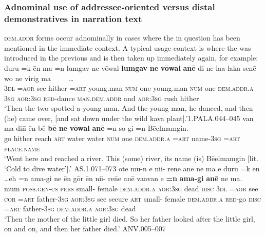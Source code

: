 \documentclass[output=paper
,modfonts
,nonflat]{langsci/langscibook}
\begin{document}
\subsubsection{Adnominal use of addressee-oriented versus distal demonstratives in narration text}
\textsc{dem.addr} forms occur adnominally in cases where the  in question has been mentioned in the immediate context. A typical usage context is where the  was introduced in the previous  and is then taken up immediately again, for example:
\ea	\label{ex46}
\gll		duru	=k 	{\textquotesingle}\=en 	ma	=n 	lumgav 		ne 	v\=owal			\textbf{lumgav} 		\textbf{ne}		\textbf{v\=owal} \textbf{an\=e}			di		ne 		laa-laka 	sen\=e 	wo 			ne 		virig 	ma~~~~~{\ob}\dots{\cb}		\\
		\textsc{3dl}	\textsc{=aor}	see		hither	\textsc{=art}	young.man	\textsc{num}		one		young.man 	\textsc{num}	one		\textsc{dem.addr.a}	\textsc{3sg}	\textsc{aor:3sg}	\textsc{red-}dance		\textsc{man.dem.addr}			and			\textsc{aor:3sg}	rush	hither \\
\glt	`Then the two spotted a young man. And the young man, he danced, and then (he) came over, [and sat down under the wild kava plant].'\hfill{1.PALA.044--045}
\z
\ea	\label{ex47}
\gll		van 	ma 		di\=n 		\=en 	b\=e		\textbf{b\=e} 		\textbf{ne} 	\textbf{v\=owal} \textbf{an\=e}		=n 		so-gi	=n		B\=e{\textquotesingle}elmamgin.		\\
go		hither		reach		\textsc{art}		water		water		\textsc{num}	one		\textsc{dem.addr.a}	\textsc{=art}		name-\textsc{3sg}	\textsc{=art}	\textsc{place.name}		\\
\glt	`Went here and reached a river. This (some) river, its name (is) B\=e{\textquotesingle}elmamgin [lit. `Cold to dive water'].'	\hfill{AS.1.071--073}
\z
\ea	\label{ex48}
\gll		ote 	mu-n 		e 		ni{\textquotesingle}i- 	re\=ne 		an\=e 		ne 		ma{\textquotesingle}		e 		duru	=k 	{\textquotesingle}\=en \dots eh		=n 	{\textquotesingle}ama-gi	ne 		{\textquotesingle}\=en 	g\=or 		\=en 	ni{\textquotesingle}i- 	re\=ne 		an\=e 		vaavan			{\textquotesingle}e		\textbf{=n} \textbf{	{\textquotesingle}ama-gi} 		\textbf{an\=e} 		ne 		ma{\textquotesingle}.			\\
mum	\textsc{poss.gen-cs}	\textsc{pers}	small-	female	\textsc{dem.addr.a}	\textsc{aor:3sg}	dead		\textsc{disc}	\textsc{3dl}	\textsc{=aor}	see	\textsc{cor}	\textsc{=art}	father-\textsc{3sg}	\textsc{aor:3sg}	see		secure	\textsc{art}	small-	female	\textsc{dem.addr.a}	\textsc{red-}go		\textsc{disc}	\textsc{=art}	father-\textsc{3sg}	\textsc{dem.addr.a}	\textsc{aor:3sg}		dead		\\
\glt	`Then the mother of the little girl died. So her father looked after the little girl, on and on, and then her father died.'	\hfill{ANV.005--007}
\z
\end{document}
